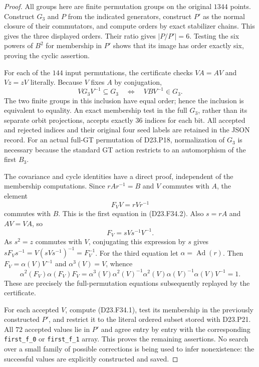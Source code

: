 \begin{proof}
All groups here are finite permutation groups on the original
$1344$ points. Construct $G_3$ and $P$ from the indicated generators,
construct $P'$ as the normal closure of their commutators, and compute
orders by exact stabilizer chains. This gives the three displayed
orders. Their ratio gives $|P/P'|=6$. Testing the six powers of
$B^2$ for membership in $P'$ shows that its image has order exactly
six, proving the cyclic assertion.

For each of the $144$ input permutations, the certificate checks
$VA=AV$ and $Vz=zV$ literally. Because $V$ fixes $A$ by conjugation,
\[
             VG_3V^{-1}\subseteq G_3
       \quad\Longleftrightarrow\quad VBV^{-1}\in G_3.
\]
The two finite groups in this inclusion have equal order; hence the
inclusion is equivalent to equality. An exact membership test in the
full $G_3$, rather than its separate orbit projections, accepts
exactly $36$ indices for each bit. All accepted and rejected indices
and their original four seed labels are retained in the JSON record.
For an actual full-GT permutation of D23.P18, normalization of $G_3$
is necessary because the standard GT action restricts to an
automorphism of the first $B_3$.

The covariance and cycle identities have a direct proof, independent
of the membership computations. Since $rAr^{-1}=B$ and $V$ commutes
with $A$, the element
\[
                       F_V V=rVr^{-1}
\]
commutes with $B$. This is the first equation in (D23.F34.2).
Also $s=rA$ and $AV=VA$, so
\[
                    F_V=sVs^{-1}V^{-1}.
\]
As $s^2=z$ commutes with $V$, conjugating this expression by $s$
gives $sF_Vs^{-1}=V(sVs^{-1})^{-1}=F_V^{-1}$.
For the third equation let $\alpha=\operatorname{Ad}(r)$.
Then $F_V=\alpha(V)V^{-1}$ and $\alpha^3(V)=V$, whence
\[
 \alpha^2(F_V)\alpha(F_V)F_V
 =\alpha^3(V)\alpha^2(V)^{-1}
  \alpha^2(V)\alpha(V)^{-1}\alpha(V)V^{-1}=1.
\]
These are precisely the full-permutation equations subsequently
replayed by the certificate.

For each accepted $V$, compute (D23.F34.1), test its membership in
the previously constructed $P'$, and restrict it to the literal
ordered subset stored with D23.P21. All $72$ accepted values lie in
$P'$ and agree entry by entry with the corresponding
\texttt{first\_f\_0} or \texttt{first\_f\_1} array. This proves the
remaining assertions. No search over a small family of possible
corrections is being used to infer nonexistence: the successful values
are explicitly constructed and saved.
\end{proof}

